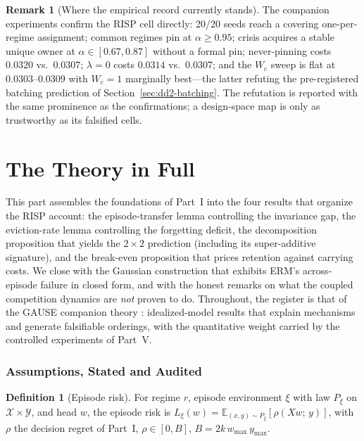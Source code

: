 \documentclass[11pt,a4paper]{article}
\theoremstyle{definition}
\newtheorem{definition}{Definition}[section]
\newtheorem{remark}{Remark}[section]
\theoremstyle{plain}
\newcommand{\E}{\mathbb{E}}
\newcommand{\nm}{\textsc{RISP}}
\begin{document}
\begin{remark}[Where the empirical record currently stands]
The companion experiments confirm the \nm{} cell directly: 20/20 seeds reach
a covering one-per-regime assignment; common regimes pin at
$\alpha \ge 0.95$; crisis acquires a stable unique owner at
$\alpha \in [0.67, 0.87]$ without a formal pin; never-pinning costs $0.0320$
vs.\ $0.0307$; $\lambda = 0$ costs $0.0314$ vs.\ $0.0307$; and the $W_c$
sweep is flat at $0.0303$--$0.0309$ with $W_c = 1$ marginally best---the
latter refuting the pre-registered batching prediction of
Section~\ref{sec:dd2-batching}. The refutation is reported with the same
prominence as the confirmations; a design-space map is only as trustworthy
as its falsified cells.
\end{remark}
\part{The Theory in Full}

This part assembles the foundations of Part~I into the four results that
organize the \nm{} account: the episode-transfer lemma controlling the
invariance gap, the eviction-rate lemma controlling the forgetting
deficit, the decomposition proposition that yields the $2{\times}2$
prediction (including its super-additive signature), and the break-even
proposition that prices retention against carrying costs. We close with
the Gaussian construction that exhibits ERM's across-episode failure in
closed form, and with the honest remarks on what the coupled competition
dynamics are \emph{not} proven to do. Throughout, the register is that of
the GAUSE companion theory \cite{li2026gause}: idealized-model results
that explain mechanisms and generate falsifiable orderings, with the
quantitative weight carried by the controlled experiments of Part~V.

\section{Assumptions, Stated and Audited}
\label{sec:dd4-assumptions}

\begin{definition}[Episode risk]
\label{def:dd4-risk}
For regime $r$, episode environment $\xi$ with law $P_\xi$ on
$\mathcal{X} \times \mathcal{Y}$, and head $w$, the episode risk is
$L_\xi(w) = \E_{(x,y) \sim P_\xi}[\rho(Xw;\, y)]$, with $\rho$ the
decision regret of Part~I, $\rho \in [0, B]$,
$B = 2 k\, w_{\max}\, y_{\max}$.
\end{definition}
\end{document}
